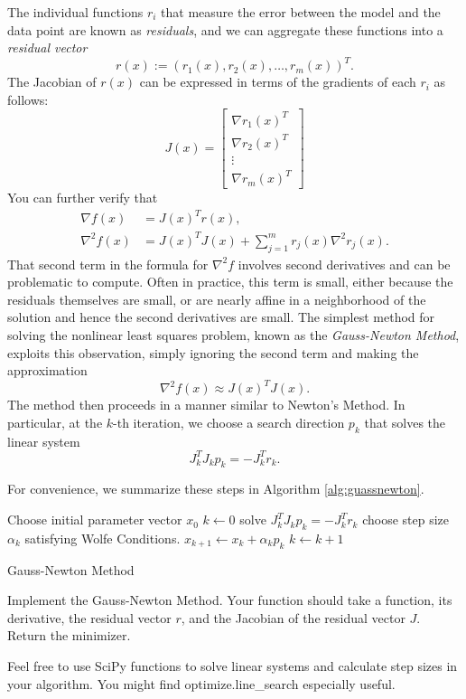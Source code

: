 The individual functions $r_i$ that measure the error between the model and the data point are known as \emph{residuals},
and we can aggregate these functions into a \emph{residual vector}
$$
r(x) := (r_1(x), r_2(x), \ldots, r_m(x))^T.
$$
The Jacobian of $r(x)$ can be expressed in terms of the gradients of each $r_i$ as follows:
$$
J(x) = \begin{bmatrix} \nabla r_1(x)^T \\ \nabla r_2(x)^T \\ \vdots \\ \nabla r_m(x)^T \end{bmatrix}
$$
You can further verify that
\begin{align*}
\nabla f(x) &= J(x)^T r(x), \\
\nabla^2 f(x) &= J(x)^TJ(x) + \displaystyle \sum_{j=1}^m r_j(x) \nabla^2r_j(x).
\end{align*}
That second term in the formula for $\nabla^2 f$ involves second derivatives and can be problematic to compute. Often in practice,
this term is small, either because the residuals themselves are small, or are nearly affine in a neighborhood of the solution and
hence the second derivatives are small.
The simplest method for solving the nonlinear least squares problem, known as the \emph{Gauss-Newton Method}, exploits this
observation, simply ignoring the second term and making the approximation
$$
\nabla^2 f(x) \approx J(x)^TJ(x).
$$
The method then proceeds in a manner similar to Newton's Method. In particular, at the $k$-th iteration, we choose a search
direction $p_k$ that solves the linear system
$$
J_k^TJ_kp_k = -J_k^Tr_k.
$$

For convenience, we summarize these steps in Algorithm \ref{alg:guassnewton}.

\begin{algorithm}
\begin{algorithmic}[1]
    \State \textrm{Choose initial parameter vector } $x_0$
    \State $k \gets 0$
        \State \textrm{solve } $J_k^TJ_kp_k = -J_k^Tr_k$
        \State \textrm{choose step size } $\alpha_k$ \textrm{ satisfying Wolfe Conditions.}
        \State $x_{k+1} \gets x_k + \alpha_kp_k$
        \State $k \gets k+1$
    \EndWhile
\EndProcedure
\end{algorithmic}
\caption{Gauss-Newton Method}
\label{alg:guassnewton}
\end{algorithm}

\begin{problem}
Implement the Gauss-Newton Method. Your function should take a function,
its derivative, the residual vector $r$, and the Jacobian of the residual
vector $J$. Return the minimizer.

Feel free to use SciPy functions to solve linear systems and calculate step sizes
in your algorithm. You might find optimize.line\_search especially useful.
\end{problem}

